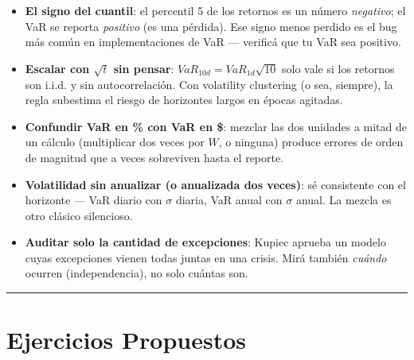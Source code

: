 \documentclass[
  spanish,
  letterpaper,
  DIV=11,
  numbers=noendperiod]{scrreprt}
\providecommand{\tightlist}{%
  \setlength{\itemsep}{0pt}\setlength{\parskip}{0pt}}
\begin{document}
\begin{tcolorbox}[enhanced jigsaw, bottomrule=.15mm, colback=white, opacitybacktitle=0.6, arc=.35mm, toprule=.15mm, opacityback=0, breakable, titlerule=0mm, left=2mm, coltitle=black, colbacktitle=quarto-callout-warning-color!10!white, colframe=quarto-callout-warning-color-frame, leftrule=.75mm, toptitle=1mm, bottomtitle=1mm, title=\textcolor{quarto-callout-warning-color}{\faExclamationTriangle}\hspace{0.5em}{Trampas frecuentes}, rightrule=.15mm]

\begin{itemize}
\tightlist
\item
  \textbf{El signo del cuantil}: el percentil 5 de los retornos es un
  número \emph{negativo}; el VaR se reporta \emph{positivo} (es una
  pérdida). Ese signo menos perdido es el bug más común en
  implementaciones de VaR --- verificá que tu VaR sea positivo.
\item
  \textbf{Escalar con \(\sqrt{t}\) sin pensar}:
  \(VaR_{10d} = VaR_{1d}\sqrt{10}\) solo vale si los retornos son i.i.d.
  y sin autocorrelación. Con volatility clustering (o sea, siempre), la
  regla subestima el riesgo de horizontes largos en épocas agitadas.
\item
  \textbf{Confundir VaR en \% con VaR en \$}: mezclar las dos unidades a
  mitad de un cálculo (multiplicar dos veces por \(W\), o ninguna)
  produce errores de orden de magnitud que a veces sobreviven hasta el
  reporte.
\item
  \textbf{Volatilidad sin anualizar (o anualizada dos veces)}: sé
  consistente con el horizonte --- VaR diario con \(\sigma\) diaria, VaR
  anual con \(\sigma\) anual. La mezcla es otro clásico silencioso.
\item
  \textbf{Auditar solo la cantidad de excepciones}: Kupiec aprueba un
  modelo cuyas excepciones vienen todas juntas en una crisis. Mirá
  también \emph{cuándo} ocurren (independencia), no solo cuántas son.
\end{itemize}

\end{tcolorbox}

\begin{center}\rule{0.5\linewidth}{0.5pt}\end{center}

\chapter{Ejercicios Propuestos}\label{ejercicios-propuestos-10}
\end{document}
